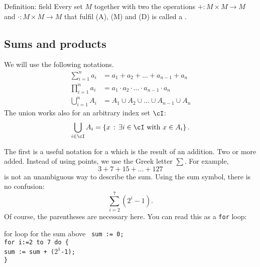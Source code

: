 \begin{Addinfo}{Definition: field}
Every set $M$
together with two the operations $+ : M \times M \rightarrow M$
and  $\cdot : M \times M \rightarrow M$
that fulfil (A), (M) and (D) is called a .
\end{Addinfo}


\subsection*{Sums and products}
We will use the following notations.
\begin{align*}
 \sum_{i=1}^n a_i &= a_1+a_2+\dots+a_{n-1}+a_n\\
 \prod_{i=1}^n a_i &= a_1 \cdot a_2 \cdot \dots \cdot a_{n-1}\cdot a_n\\
 \bigcup_{i=1}^n A_i &= A_1 \cup A_2 \cup \dots \cup A_{n-1}\cup A_n
\end{align*}
The union works also for an arbitrary index set $\cI$:
$$
	\bigcup_{i \in \cI} A_i = \{ x \,:\, \exists i \in \cI \text{ with } x \in A_i \} \,.
$$

The first is a useful notation for a  which is
the result of an addition. Two or
more  added. Instead of using points, we use the Greek letter $\sum$. For example,
\[
3+7+15+\ldots+127 
\]
is not an unambiguous way to describe the sum. 
Using the sum symbol, there is no confusion:
\begin{equation*} %
\sum_{i=2}^7 (2^i-1).
\end{equation*}
Of course, the parentheses are necessary here.
You can read this as a {\texttt{for}} loop:

\begin{Boxx}{for loop for the sum above}
\textnormal{\texttt{
\hspace*{10mm}sum := 0;\\
\hspace*{10mm}for i:=2 to 7 do \{\\
\hspace*{15mm}sum := sum + ($2^\texttt{i}$-1);\\
\hspace*{10mm}\}
}
}
\end{Boxx}


